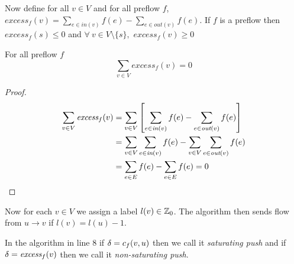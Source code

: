 Now define for all $v\in V$ and for all preflow $f$, $\textit{excess}_f(v)=\sum\limits_{e\in\textit{in}(v)}f(e)-\sum\limits_{e\in\textit{out}(v)}f(e)$. If $f$ is a preflow then $\textit{excess}_f(s)\leq 0$ and $\forall\ v\in V\setminus\{s\},$ $\textit{excess}_f(v)\geq 0$
\begin{lemma}{}{}
	For all preflow $f$ $$\sum\limits_{v\in V}\textit{excess}_f(v)=0$$
\end{lemma}
\begin{proof}
	\begin{align*}
		\sum\limits_{v\in V}\textit{excess}_f(v) & = \sum\limits_{v\in V}\left[ \sum\limits_{e\in\textit{in}(v)}f(e)-\sum\limits_{e\in\textit{out}(v)}f(e)\right]            \\
		                                         & = \sum\limits_{v\in V}\sum\limits_{e\in\textit{in}(v)}f(e)-\sum\limits_{v\in V}\sum\limits_{e\in\textit{out}(v)}f(e) \\
		                                         & = \sum_{e\in E}f(e)-\sum_{e\in E}f(e)=0
	\end{align*}
\end{proof}
Now for each $v\in V$ we assign a label $l(v)\in\mathbb{Z}_0$. The algorithm then sends flow from $u\to v$ if $l(v)=l(u)-1$.
\begin{center}
\end{center}
\begin{algorithm}
	\DontPrintSemicolon
	\caption{}
\end{algorithm}
In the algorithm in line 8 if $\delta=c_f(v,u)$ then we call it \textit{saturating push} and if $\delta=\textit{excess}_f(v)$ then we call it \textit{non-saturating push}.

